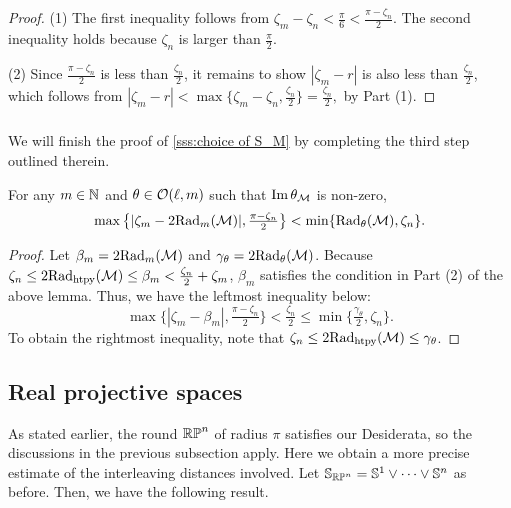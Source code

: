 \begin{proof}
   	(1) The first inequality follows from $\zeta_m - \zeta_n < \tfrac{\pi}{6} < \tfrac{\pi - \zeta_n}{2}$.
    The second inequality holds because $\zeta_n$ is larger than $\tfrac{\pi}{2}$.

    (2) Since $\tfrac{\pi - \zeta_n}{2}$ is less than $\tfrac{\zeta_n}{2}$, it remains to show $|\zeta_m  - r |$ is also less than $\tfrac{\zeta_n}{2}$, which follows from
   	\(
   	|\zeta_m  - r | < \max\big\{\zeta_m - \zeta_n, \tfrac{\zeta_n}{2}\big\} = \tfrac{\zeta_n}{2},
   	\) by Part (1).
\end{proof}

\subsubsection{}\label{sss:comparison_lemma_zeta_n}

We will finish the proof of \cref{sss:choice of S_M} by completing the third step outlined therein.

\lemma
For any $m \in \mathbb{N}$ and $\theta \in \mathcal{O}(\ell, m)$ such that $\operatorname{Im} \theta_{\mathcal{M}}$ is non-zero,
\[\max\big\{|\zeta_m  - 2\mathrm{Rad}_{m}(\mathcal{M}) |, \tfrac{\pi - \zeta_n}{2}\big\} < \min\{\mathrm{Rad}_{\theta}(\mathcal{M}), \zeta_n\}.\]
\begin{proof}
    Let $\beta_m = 2\mathrm{Rad}_{m}(\mathcal{M})$ and $\gamma_\theta = 2\mathrm{Rad}_{\theta}(\mathcal{M})$.
    Because \(\zeta_n \leq 2\mathrm{Rad}_{\mathrm{htpy}}(\mathcal{M}) \leq \beta_m < \tfrac{\zeta_n}{2} + \zeta_m\), $\beta_m$ satisfies the condition in Part (2) of the above lemma.
    Thus, we have the leftmost inequality below:
    \[
    \max\big\{|\zeta_m - \beta_m|, \tfrac{\pi - \zeta_n}{2}\big\} < \tfrac{\zeta_n}{2}
    \leq
    \min\big\{\tfrac{\gamma_\theta}{2}, \zeta_n\big\}.
    \]
    To obtain the rightmost inequality, note that \(\zeta_n \leq 2\mathrm{Rad}_{\mathrm{htpy}}(\mathcal{M}) \leq \gamma_\theta\).
\end{proof}

\subsection{Real projective spaces}\label{ss:distance_estimate_rpn}

As stated earlier, the round \(\mathbb{RP}^n\) of radius \(\pi\) satisfies our Desiderata, so the discussions in the previous subsection apply.
Here we obtain a more precise estimate of the interleaving distances involved.
Let \(\mathbb{S}_{\mathbb{RP}^n} = \mathbb{S}^1 \vee \dots \vee \mathbb{S}^n\) as before.
Then, we have the following result.

